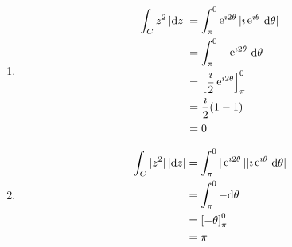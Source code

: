 {\begin{Solution}
\begin{enumerate}
  \item
    \begin{align*}
      \int_C z^2 \,|\mathrm{d} z|
      &= \int_{\pi}^{0} \mathop{\mathrm{e}}\nolimits^{\imath 2 \theta} | \imath \mathop{\mathrm{e}}\nolimits^{\imath \theta} \,\mathrm{d} \theta|
      \\
      &= \int_{\pi}^{0} - \mathop{\mathrm{e}}\nolimits^{\imath 2 \theta} \,\mathrm{d} \theta 
      \\
      &= \left[ \frac{\imath}{2} \mathop{\mathrm{e}}\nolimits^{\imath 2 \theta} \right]_{\pi}^{0} 
      \\
      &= \frac{\imath}{2} (1 - 1) 
      \\
      &= 0
    \end{align*}
  \item
    \begin{align*}
      \int_C |z^2| \,|\mathrm{d} z|
      &= \int_{\pi}^{0} |\mathop{\mathrm{e}}\nolimits^{\imath 2 \theta}| |\imath \mathop{\mathrm{e}}\nolimits^{\imath \theta} \,\mathrm{d} \theta|
      \\
      &= \int_{\pi}^{0} - \mathrm{d} \theta 
      \\
      &= \left[ - \theta \right]_{\pi}^{0} 
      \\
      &= \pi
    \end{align*}
  \end{enumerate}
\end{Solution}









}
